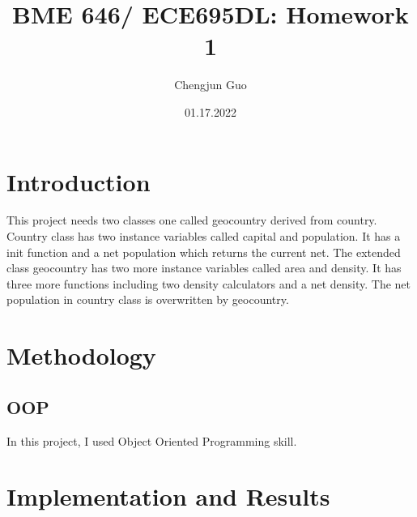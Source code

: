 \documentclass[letterpaper,12pt, scrartcl]{article}
\title{BME 646/ ECE695DL: Homework 1 }
\date{01.17.2022}
\author{Chengjun Guo}
\begin{document}
\maketitle
\section {Introduction}

This project needs two classes one called geocountry derived from country. Country class has two instance variables called capital and population. It has a init function and a net population which returns the current net. The extended class geocountry has two more instance variables called area and density. It has three more functions including two density calculators and a net density. The net population in country class is overwritten by geocountry.


\section {Methodology}
\subsection{OOP}
In this project, I used Object Oriented Programming skill.

\section{Implementation and Results}
\end{document}
